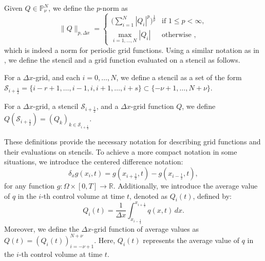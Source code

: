 Given $Q \in \mathbb{P}^{N}_{\nu}$, we define the $p$-norm as
\begin{equation}
	\label{chp2-sec-not1}
	\|Q\|_{p,\Delta x}=
	\begin{cases}
		\bigg( \sum_{i=1}^{N} |Q_i|^p \bigg)^{\frac{1}{p}} & \text{if } 1\leq p < \infty,\\
		\max_{i=1, \ldots, N}{|Q_i|} & \text{otherwise },
	\end{cases}
\end{equation}
which is indeed a norm for periodic grid functions.
Using a similar notation as in \citet{engwirda:2016}, we define the stencil and a grid function evaluated on a stencil as follows.
\begin{definition}[Stencil]
	For a $\Delta x$-grid, and each $i = 0, \ldots, N$, we define a stencil as a set of the form
	$\mathcal{S}_{i+\frac{1}{2}} = \{i-r+1, \ldots, i-1, i, i+1, \ldots, i+s\} \subset\{-\nu+1, \ldots, N+\nu\}$.
\end{definition}
\begin{definition}
	For a $\Delta x$-grid, a stencil $\mathcal{S}_{i+\frac{1}{2}}$,
	 and a $\Delta x$-grid function $Q$, we define $Q(\mathcal{S}_{i+\frac{1}{2}}) = (Q_k)_{k \in \mathcal{S}_{i+\frac{1}{2}}}$.
\end{definition}
These definitions provide the necessary notation for describing grid functions and their evaluations on stencils.
To achieve a more compact notation in some situations, we introduce the centered difference notation:
\begin{equation}
    \label{chp2-sec-adv-eq5}
	\delta_x {g}(x_i,t) = 
	{g}(x_{i+\frac{1}{2}},t) - 
	{g}(x_{i-\frac{1}{2}},t),
\end{equation}
for any function $g: \Omega \times [0,T] \to \mathbb{R}$.
Additionally, we introduce the average value of $q$ in the $i$-th control volume at time $t$, denoted as ${Q}_i(t)$, defined by:
\begin{equation}
	\label{chp2-sec1-not2}
	{Q}_i(t) = \frac{1}{\Delta x} \int_{x_{i-\frac{1}{2}}}^{x_{i+\frac{1}{2}}} {q}(x,t) \,dx.
\end{equation}
Moreover, we define the $\Delta x$-grid function of average values as $Q(t) = (Q_i(t))_{i=-\nu+1}^{N+\nu}$.
Here, $Q_i(t)$ represents the average value of $q$ in the $i$-th control volume at time $t$.

